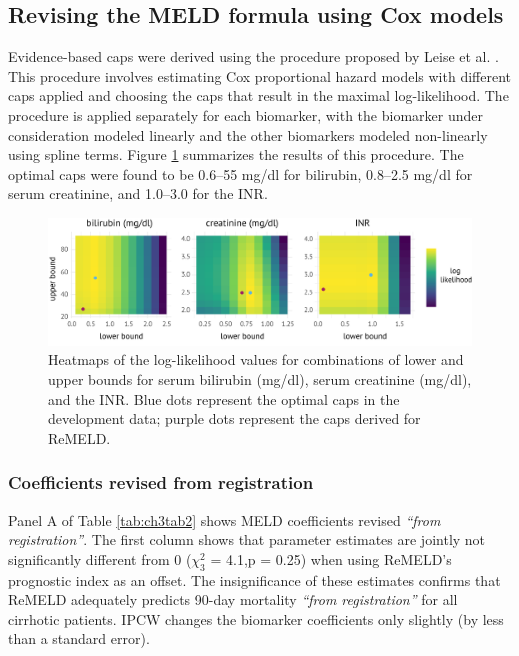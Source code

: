 \documentclass[11pt,twoside,]{book}
\begin{document}
\endgroup
\FloatBarrier

\subsection{Revising the MELD formula using Cox models}\label{revising-the-meld-formula-using-cox-models}

Evidence-based caps were derived using the procedure proposed by Leise et al.
\citep{leiseRevisedModelEndstage2011}. This procedure involves estimating
Cox proportional hazard models with different caps applied and
choosing the caps that result in the maximal log-likelihood. The procedure
is applied separately for each biomarker, with the biomarker under consideration
modeled linearly and the other biomarkers modeled non-linearly using
spline terms. Figure \ref{fig:ch3sfig3} summarizes the results
of this procedure. The optimal caps were found to be 0.6--55 mg/dl for bilirubin,
0.8--2.5 mg/dl for serum
creatinine, and 1.0--3.0 for the INR.

\begin{figure}[h]

{\centering \includegraphics[width=1\linewidth]{figures/ch3//fig_ll} 

}

\caption{Heatmaps of the log-likelihood values for combinations of lower and upper bounds for serum bilirubin (mg/dl), serum creatinine (mg/dl), and the INR. Blue dots represent the optimal caps in the development data; purple dots represent the caps derived for ReMELD.}\label{fig:ch3sfig3}
\end{figure}

\FloatBarrier

\subsubsection{Coefficients revised from registration}\label{coefficients-revised-from-registration}

Panel A of Table \ref{tab:ch3tab2} shows MELD coefficients revised \emph{``from
registration''}. The first column shows that parameter estimates are
jointly not significantly different from 0
(\(\chi_{3}^{2}\) = 4.1,p = 0.25) when using ReMELD's prognostic
index as an offset. The insignificance of these estimates confirms
that ReMELD adequately predicts 90-day mortality \emph{``from registration''} for all cirrhotic
patients. IPCW changes the biomarker
coefficients only slightly (by less than a standard error).
\end{document}
